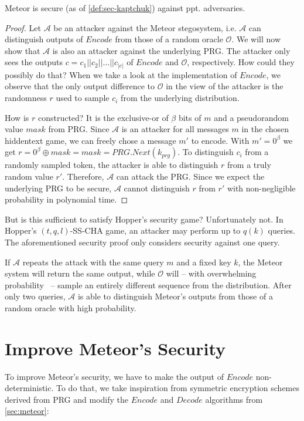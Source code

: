 \begin{theorem}
	Meteor is secure (as of \autoref{def:sec-kaptchuk}) against ppt. adversaries. 
\end{theorem}
\begin{proof}
	Let $\mathcal{A}$ be an attacker against the Meteor stegosystem, i.e. $\mathcal{A}$ can distinguish outputs of $Encode$ from those of a random oracle $\mathcal{O}$. We will now show that $\mathcal{A}$ is also an attacker against the underlying PRG.
	The attacker only sees the outputs $c = c_1 ||c_2 || \dots || c_{|c|}$ of $Encode$ and $\mathcal{O}$, respectively. 
	How could they possibly do that?
	When we take a look at the implementation of $Encode$, we observe that the only output difference to $\mathcal{O}$ in the view of the attacker is the randomness $r$ used to sample $c_i$ from the underlying distribution.
	
	How is $r$ constructed? 
	It is the exclusive-or of $\beta$ bits of $m$ and a pseudorandom value $mask$ from PRG.
	Since $\mathcal{A}$ is an attacker for all messages $m$ in the chosen hiddentext game, we can freely chose a message $m'$ to encode.
	With $m' = 0^\beta$ we get $r = 0^\beta \oplus mask = mask = PRG.Next(k_{prg})$.
	To distinguish $c_i$ from a randomly sampled token, the attacker is able to distinguish $r$ from a truly random value $r'$.
	Therefore, $\mathcal{A}$ can attack the PRG.
	Since we expect the underlying PRG to be secure, $\mathcal{A}$ cannot distinguish $r$ from $r'$ with non-negligible probability in polynomial time.
\end{proof}

But is this sufficient to satisfy Hopper's security game?
Unfortunately not.
In Hopper's $(t,q,l)$-SS-CHA game, an attacker may perform up to $q(k)$ queries.
The aforementioned security proof only considers security against one query.

If $\mathcal{A}$ repeats the attack with the same query $m$ and a fixed key $k$, the Meteor system will return the same output, while $\mathcal{O}$ will -- with overwhelming probability~ -- sample an entirely different sequence from the distribution.
After only two queries, $\mathcal{A}$ is able to distinguish Meteor's outputs from those of a random oracle with high probability.

\section{Improve Meteor's Security}

To improve Meteor's security, we have to make the output of $Encode$ non-deterministic. To do that, we take inspiration from symmetric encryption schemes derived from PRG and modify the $Encode$ and $Decode$ algorithms from \autoref{sec:meteor}:

